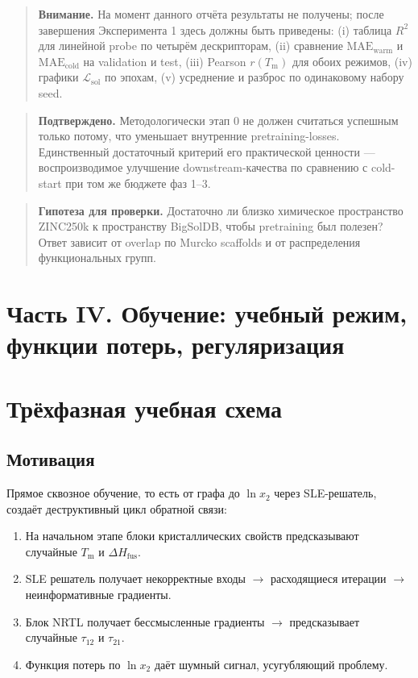 \documentclass[11pt]{article}
\newcommand{\warnnote}[1]{\begin{quote}\textbf{Внимание.} #1\end{quote}}
\newcommand{\validated}[1]{\begin{quote}\textbf{Подтверждено.} #1\end{quote}}
\newcommand{\openquestion}[1]{\begin{quote}\textbf{Гипотеза для проверки.} #1\end{quote}}
\begin{document}
\warnnote{На момент данного отчёта результаты не получены; после завершения Эксперимента 1 здесь должны быть приведены: (i) таблица $R^2$ для линейной probe по четырём дескрипторам, (ii) сравнение $\mathrm{MAE}_{\mathrm{warm}}$ и $\mathrm{MAE}_{\mathrm{cold}}$ на validation и test, (iii) Pearson $r(T_{\mathrm{m}})$ для обоих режимов, (iv) графики $\mathcal{L}_{\mathrm{sol}}$ по эпохам, (v) усреднение и разброс по одинаковому набору seed.}

\validated{Методологически этап 0 не должен считаться успешным только потому, что уменьшает внутренние pretraining-losses. Единственный достаточный критерий его практической ценности --- воспроизводимое улучшение downstream-качества по сравнению с cold-start при том же бюджете фаз 1--3.}

\openquestion{Достаточно ли близко химическое пространство ZINC250k к пространству BigSolDB, чтобы pretraining был полезен? Ответ зависит от overlap по Murcko scaffolds и от распределения функциональных групп.}

\section*{Часть IV. Обучение: учебный режим, функции потерь, регуляризация}

\section{Трёхфазная учебная схема}

\subsection{Мотивация}

Прямое сквозное обучение, то есть от графа до $\ln x_2$ через SLE-решатель, создаёт деструктивный цикл обратной связи:

\begin{enumerate}
  \item На начальном этапе блоки кристаллических свойств предсказывают случайные $T_{\mathrm{m}}$ и $\Delta H_{\mathrm{fus}}$.
  \item SLE решатель получает некорректные входы $\to$ расходящиеся итерации $\to$ неинформативные градиенты.
  \item Блок NRTL получает бессмысленные градиенты $\to$ предсказывает случайные $\tau_{12}$ и $\tau_{21}$.
  \item Функция потерь по $\ln x_2$ даёт шумный сигнал, усугубляющий проблему.
\end{enumerate}
\end{document}
